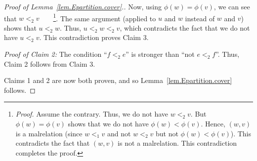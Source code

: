 \documentclass[12pt]{article}
\theoremstyle{plain}
\theoremstyle{definition}
\theoremstyle{remark}
\begin{document}
\begin{proof}[Proof of Lemma~\ref{lem.Epartition.cover}.]
Now, using $\phi\left(w\right) = \phi\left(v\right)$, we can
see that $w <_2 v$\ \ \ \ \footnote{\textit{Proof.} Assume
the contrary. Thus, we do not have $w <_2 v$. But
$\phi\left(w\right) = \phi\left(v\right)$ shows that we do not
have $\phi\left(w\right) < \phi\left(v\right)$. Hence,
$\left(w, v\right)$ is a malrelation (since $w <_1 v$ and not
$w <_2 v$ but not $\phi\left(w\right) < \phi\left(v\right)$).
This contradicts the fact that $\left(w, v\right)$ is not
a malrelation. This contradiction completes the proof.}.
The same argument (applied to $u$ and $w$ instead of $w$ and
$v$) shows that $u <_2 w$. Thus, $u <_2 w <_2 v$, which
contradicts the fact that we do not have $u <_2 v$. This
contradiction proves Claim 3.

\textit{Proof of Claim 2:} The condition ``$f <_2 e$'' is stronger
than ``not $e <_2 f$''. Thus, Claim 2 follows from Claim 3.

Claims 1 and 2 are now both proven, and so
Lemma~\ref{lem.Epartition.cover} follows.
\end{proof}
\end{document}
